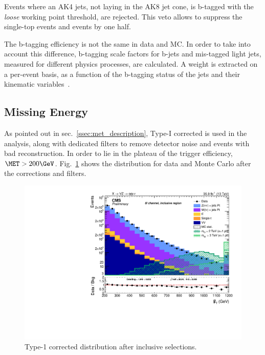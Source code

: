 \noindent Events where an AK4 jets, not laying in the AK8 jet cone, is b-tagged with the \emph{loose} working point threshold, are rejected. This veto allows to suppress the single-top events and \ttbar events by one half.

\noindent The b-tagging efficiency is not the same in data and MC. In order to take into account this difference, b-tagging scale factors for b-jets and mis-tagged light jets, measured for different physics processes, are calculated. A weight is extracted on a per-event basis, as a function of the b-tagging status of the jets and their kinematic variables~\cite{bib:btagsf}.


\subsection{Missing Energy}
As pointed out in sec.~\ref{ssec:met_description}, Type-I corrected \MET is used in the analysis, along with dedicated filters to remove detector noise and events with bad reconstruction. In order to lie in the plateau of the trigger efficiency, $\MET > 200 \GeV$. Fig.~\ref{fig:type1_met} shows the \MET distribution for data and Monte Carlo after the corrections and filters.
 
 \begin{figure}[!htb]
   \centering
     \includegraphics[width=.495\textwidth]{plots/v9_U/XVZnnInc/MEt_pt.pdf}
   
   \caption{Type-1 corrected \MET distribution after inclusive selections.}
   \label{fig:type1_met}
 \end{figure}


